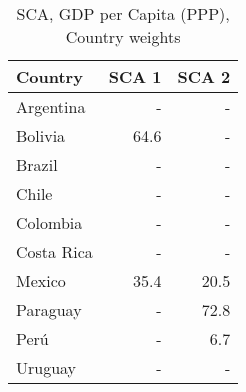 \begin{table}[!htbp]
\begin{center}
\caption{SCA, GDP per Capita (PPP), Country weights} \label{table:GDP_weights}
\begin{tabular}{l r r }      \\ \toprule
  Country    & SCA 1 & SCA 2 \\ \midrule
  Argentina  &   -   &   -   \\
  Bolivia    & 64.6  &   -   \\
  Brazil     &   -   &   -   \\
  Chile      &   -   &   -   \\
  Colombia   &   -   &   -   \\ \midrule
  Costa Rica &   -   &   -   \\
  Mexico     & 35.4  & 20.5  \\
  Paraguay   &   -   & 72.8  \\
  Perú       &   -   &  6.7  \\
  Uruguay    &   -   &   -   \\
  \bottomrule 
\end{tabular}
\singlespacing \footnotesize \raggedright
\end{center}
\end{table}